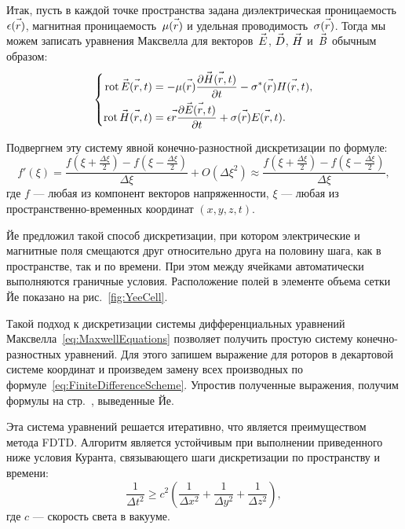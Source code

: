 Итак, пусть в каждой точке пространства задана диэлектрическая
проницаемость~$\epsilon(\vec{r\mathstrut})$, магнитная проницаемость~$\mu(\vec{r\mathstrut})$
и удельная проводимость~$\sigma(\vec{r\mathstrut})$. Тогда мы можем записать уравнения
Максвелла для векторов~$\vec{E\mathstrut}$, $\vec{D\mathstrut}$, $\vec{H\mathstrut}$ и~$\vec{B\mathstrut}$ обычным
образом:
\begin{equation}
    \label{eq:MaxwellEquations}
    \left\{
    \begin{aligned}
        \operatorname{rot}{\vec{E\mathstrut}(\vec{r\mathstrut},t)} &=
            -\mu(\vec{r\mathstrut})\frac{\partial\vec{H\mathstrut}(\vec{r\mathstrut},t)}{\partial t}
            -\sigma^*(\vec{r\mathstrut})H(\vec{r\mathstrut},t), \\
        \operatorname{rot}{\vec{H\mathstrut}}(\vec{r\mathstrut},t) &=
            \epsilon{\ensuremath{\vec{r\mathstrut}}}\frac{\partial\vec{E\mathstrut}(\vec{r\mathstrut},t)}{\partial t} +
            \sigma(\vec{r\mathstrut})E(\vec{r\mathstrut},t).
    \end{aligned}
    \right.
\end{equation}

Подвергнем эту систему явной конечно-разностной дискретизации по формуле:
\vspace{-0.3cm}
\begin{equation}
    \label{eq:FiniteDifferenceScheme}
    f'(\xi) =
        \frac{f(\xi+\frac{\Delta\xi}{2})-f(\xi-\frac{\Delta\xi}{2})}{\Delta\xi}
        + O(\Delta\xi^2) \approx
        \frac{f(\xi+\frac{\Delta\xi}{2})-f(\xi-\frac{\Delta\xi}{2})}{\Delta\xi},
\end{equation}
где $f$ --- любая из компонент векторов напряженности,
    $\xi$ --- любая из пространственно-временных координат $(x,y,z,t)$.

Йе предложил такой способ дискретизации, при котором электрические и магнитные
поля смещаются друг относительно друга на половину шага, как в пространстве,
так и по времени. При этом между ячейками автоматически выполняются граничные
условия. Расположение полей в элементе объема сетки Йе показано на
рис.~\ref{fig:YeeCell}.

Такой подход к дискретизации системы дифференциальных уравнений
Максвелла~\eqref{eq:MaxwellEquations} позволяет получить простую систему
конечно-разностных уравнений. Для этого запишем выражение для роторов
в декартовой системе координат и произведем замену всех производных по
формуле~\eqref{eq:FiniteDifferenceScheme}. Упростив полученные выражения,
получим формулы на стр.~\pageref{eq:BaseFdtdEquations}, выведенные Йе.

Эта система уравнений решается итеративно, что является преимуществом метода
FDTD. Алгоритм является устойчивым при выполнении приведенного ниже условия
Куранта, связывающего шаги дискретизации по пространству и времени:
\begin{equation}
\label{eq:CourantCondition}
\frac{1}{\Delta t^2} \ge c^2
\left(
    \frac{1}{\Delta x^2} +
    \frac{1}{\Delta y^2} +
    \frac{1}{\Delta z^2}
\right),
\end{equation}
где $c$ --- скорость света в вакууме.
